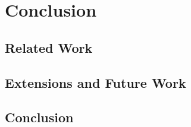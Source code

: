 \chapter{Conclusion}

\section{Related Work}

\section{Extensions and Future Work}

\section{Conclusion}
